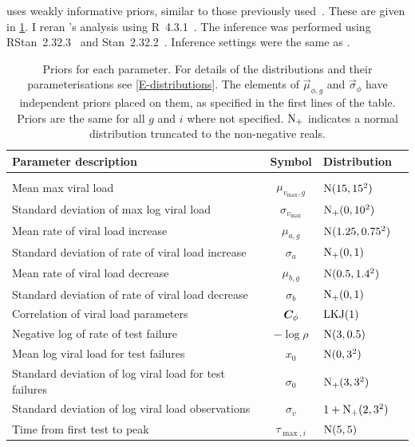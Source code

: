 \documentclass[thesis.tex]{subfiles}
\begin{document}
\textcite{hakkiOnset} uses weakly informative priors, similar to those previously used~\autocite{singanayagamCommunity}.
These are given in \cref{ATACCC:table:hakki-priors}.
I reran \textcite{hakkiOnset}'s analysis using R~4.3.1~\autocite{R-4-3-1}.
The inference was performed using RStan~2.32.3~\autocite{RStan-2-32-3} and Stan~2.32.2~\autocite{Stan-2-32-2}.
Inference settings were the same as \textcite{hakkiOnset}.
\begin{table}
\begin{tabular}{l c l l}
    Parameter description & Symbol & Distribution \\
    \hline \\
    Mean max viral load & $\mu_{v_\text{max}, g}$ & $\operatorname{N}(15, 15^2)$ \\
    Standard deviation of max log viral load & $\sigma_{v_\text{max}}$ & $\operatorname{N}_+(0, 10^2)$ \\
    Mean rate of viral load increase & $\mu_{a, g}$ & $\operatorname{N}(1.25, 0.75^2)$ \\
    Standard deviation of rate of viral load increase & $\sigma_{a}$ & $\operatorname{N}_+(0, 1)$ \\
    Mean rate of viral load decrease & $\mu_{b, g}$ & $\operatorname{N}(0.5, 1.4^2)$ \\
    Standard deviation of rate of viral load decrease & $\sigma_{b}$ & $\operatorname{N}_+(0, 1)$ \\
    Correlation of viral load parameters & $\bm{C}_\phi$ & $\operatorname{LKJ}(1)$ \\
    Negative log of rate of test failure & $-\log \rho$ & $\operatorname{N}(3, 0.5)$ \\
    Mean log viral load for test failures & $x_0$ & $\operatorname{N}(0, 3^2)$ \\
    Standard deviation of log viral load for test failures & $\sigma_0$ & $\operatorname{N}_+(3, 3^2)$ \\
    Standard deviation of log viral load observations & $\sigma_v$ & $1 + \operatorname{N}_+(2, 3^2)$ \\
    Time from first test to peak & $\tau_{\max,i}$ & $\operatorname{N}(5,5)$
\end{tabular}
\caption[SEIR model priors]{Priors for each parameter. For details of the distributions and their parameterisations see \cref{E-distributions}. The elements of $\vec{\mu}_{\phi,g}$ and $\vec{\sigma}_\phi$ have independent priors placed on them, as specified in the first lines of the table. Priors are the same for all $g$ and $i$ where not specified. $\operatorname{N}_+$ indicates a normal distribution truncated to the non-negative reals. \label{ATACCC:table:hakki-priors}}
\end{table}
\end{document}
